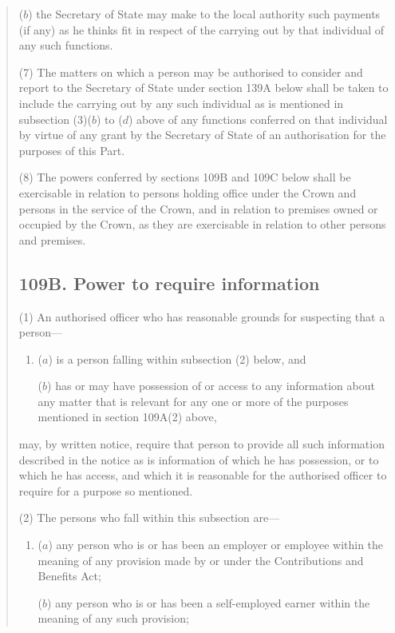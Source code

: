 \documentclass[12pt,a4paper]{article}
\begin{document}
\begin{quotation}
\begin{enumerate}
($b$) the Secretary of State may make to the local authority such payments (if any) as he thinks fit in respect of the carrying out by that individual of any such functions.
\end{enumerate}

(7) The matters on which a person may be authorised to consider and report to the Secretary of State under section 139A below shall be taken to include the carrying out by any such individual as is mentioned in subsection (3)($b$)  to ($d$)  above of any functions conferred on that individual by virtue of any grant by the Secretary of State of an authorisation for the purposes of this Part.

(8) The powers conferred by sections 109B and 109C below shall be exercisable in relation to persons holding office under the Crown and persons in the service of the Crown, and in relation to premises owned or occupied by the Crown, as they are exercisable in relation to other persons and premises.

\subsection*{109B. Power to require information}

(1) An authorised officer who has reasonable grounds for suspecting that a person—
\begin{enumerate}\item[]
($a$) is a person falling within subsection (2)  below, and

($b$) has or may have possession of or access to any information about any matter that is relevant for any one or more of the purposes mentioned in section 109A(2)  above,
\end{enumerate}
may, by written notice, require that person to provide all such information described in the notice as is information of which he has possession, or to which he has access, and which it is reasonable for the authorised officer to require for a purpose so mentioned.

(2) The persons who fall within this subsection are—
\begin{enumerate}\item[]
($a$) any person who is or has been an employer or employee within the meaning of any provision made by or under the Contributions and Benefits Act;

($b$) any person who is or has been a self-employed earner within the meaning of any such provision;


\end{enumerate}
\end{quotation}
\end{document}
